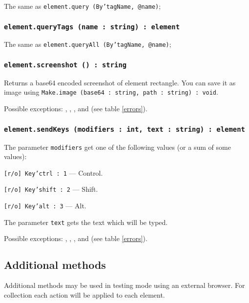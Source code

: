 The same as \texttt{element.query (By'tagName, @name)};

\subsubsection{\texttt{element.queryTags (name : string) : element}}

The same as \texttt{element.queryAll (By'tagName, @name)};

\subsubsection{\texttt{element.screenshot () : string}}

Returns a base64 encoded screenshot of element rectangle. You can save it as image using \texttt{Make.image (base64 : string, path : string) : void}.

Possible exceptions: , , ,  and  (see table \ref{errors}).

\subsubsection{\texttt{element.sendKeys (modifiers : int, text : string) : element}}

The parameter \texttt{modifiers} get one of the following values (or a sum of some values):
\begin{icItems}
	\item \texttt{[r/o] Key'ctrl : 1} — Control.
	\item \texttt{[r/o] Key'shift : 2} — Shift.
	\item \texttt{[r/o] Key'alt : 3} — Alt.
\end{icItems}

The parameter \texttt{text} gets the text which will be typed.

Possible exceptions: , , ,   and  (see table \ref{errors}).

\subsection{Additional methods}

Additional methods may be used in testing mode using an external browser. For collection each action will be applied to each element.

